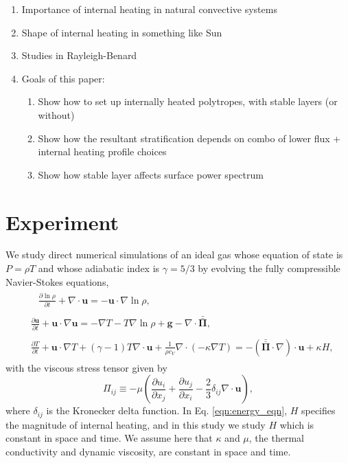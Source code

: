 \documentclass[twocolumn]{aastex61}
\newcommand{\grad}{\ensuremath{\nabla}}
\newcommand{\stressT}{\ensuremath{\bm{\bar{\bar{\Pi}}}}}
\begin{document}
\begin{enumerate}
\item Importance of internal heating in natural convective systems
\item Shape of internal heating in something like Sun
\item Studies in Rayleigh-Benard
\item Goals of this paper:
\begin{enumerate}
\item Show how to set up internally heated polytropes, with stable layers (or without)
\item Show how the resultant stratification depends on combo of lower flux + internal heating profile choices
\item Show how stable layer affects surface power spectrum
\end{enumerate}
\end{enumerate}

\section{Experiment} 
We study direct numerical simulations of an ideal gas whose equation of
state is $P = \rho T$ and whose adiabatic index is $\gamma = 5/3$
by evolving the fully compressible Navier-Stokes equations, 
\label{sec:experiment}
\begin{align}
&\begin{aligned}
&\frac{\partial \ln\rho}{\partial t} + \grad\cdot\bm{u} 
    = -\bm{u}\cdot\grad\ln\rho,
	\label{eqn:continuity_eqn}
\end{aligned}\\
&\begin{aligned}
\frac{\partial\bm{u}}{\partial t} + \bm{u}\cdot\grad\bm{u} =
- \grad T - T \grad \ln \rho + \bm{g} - \grad\cdot\stressT,
\label{eqn:momentum_eqn}
\end{aligned}\\
&\begin{aligned}
\frac{\partial T}{\partial t} + \bm{u}\cdot\grad T
+ (\gamma-1)T\grad\cdot\bm{u} + \frac{1}{\rho c_V}
\grad\cdot\left(-\kappa\grad T\right) = - (\stressT\cdot\grad)\cdot\bm{u} + \kappa H,
	\label{eqn:energy_eqn}
\end{aligned}
\end{align}
with the viscous stress tensor given by
\begin{equation}
\Pi_{ij} \equiv -\mu\left(\frac{\partial u_i}{\partial x_j} + 
\frac{\partial u_j}{\partial x_i} - \frac{2}{3}\delta_{ij}\grad\cdot\bm{u}\right),
	\label{eqn:stress_tensor}
\end{equation}
where $\delta_{ij}$ is the Kronecker delta function.  In Eq. \ref{eqn:energy_eqn}, $H$
specifies the magnitude of internal heating, and in this study we study $H$ which is
constant in space and time.  We assume here that $\kappa$ and $\mu$, the thermal
conductivity and dynamic viscosity, are constant in space and time.
\end{document}
